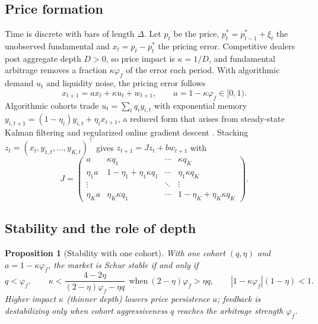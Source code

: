 \documentclass[12pt]{article}
\newtheorem{proposition}[theorem]{Proposition}
\theoremstyle{definition}
\theoremstyle{remark}
\begin{document}
\subsection{Price formation}
Time is discrete with bars of length $\Delta$. Let $p_t$ be the price, $p^*_t=p^*_{t-1}+\xi_t$ the unobserved fundamental and $x_t=p_t-p^*_t$ the pricing error. Competitive dealers post aggregate depth $D>0$, so price impact is $\kappa=1/D$, and fundamental arbitrage removes a fraction $\kappa\varphi_f$ of the error each period. With algorithmic demand $u_t$ and liquidity noise, the pricing error follows
\begin{equation}\label{eq:price}
x_{t+1}=ax_t+\kappa u_t+w_{t+1},\qquad a=1-\kappa\varphi_f\in[0,1).
\end{equation}
Algorithmic cohorts trade $u_t=\sum_iq_iy_{i,t}$ with exponential memory $y_{i,t+1}=(1-\eta_i)y_{i,t}+\eta_ix_{t+1}$, a reduced form that arises from steady-state Kalman filtering and regularized online gradient descent \citep{niroula2026}. Stacking $z_t=(x_t,y_{1,t},\ldots,y_{K,t})^\top$ gives $z_{t+1}=Jz_t+bw_{t+1}$ with
\begin{equation}\label{eq:J}
J=\begin{pmatrix} a & \kappa q_1 & \cdots & \kappa q_K\\ \eta_1 a & 1-\eta_1+\eta_1\kappa q_1 & \cdots & \eta_1\kappa q_K\\ \vdots & & \ddots & \vdots\\ \eta_K a & \eta_K\kappa q_1 & \cdots & 1-\eta_K+\eta_K\kappa q_K\end{pmatrix}.
\end{equation}

\subsection{Stability and the role of depth}

\begin{proposition}[Stability with one cohort]\label{prop:jury}
With one cohort $(q,\eta)$ and $a=1-\kappa\varphi_f$, the market is Schur stable if and only if
\begin{equation}\label{eq:jury}
q<\varphi_f,\qquad \kappa<\frac{4-2\eta}{(2-\eta)\varphi_f-\eta q}\ \ \text{when}\ (2-\eta)\varphi_f>\eta q,\qquad |1-\kappa\varphi_f|(1-\eta)<1 .
\end{equation}
Higher impact $\kappa$ (thinner depth) lowers price persistence $a$; feedback is destabilizing only when cohort aggressiveness $q$ reaches the arbitrage strength $\varphi_f$.
\end{proposition}
\end{document}
